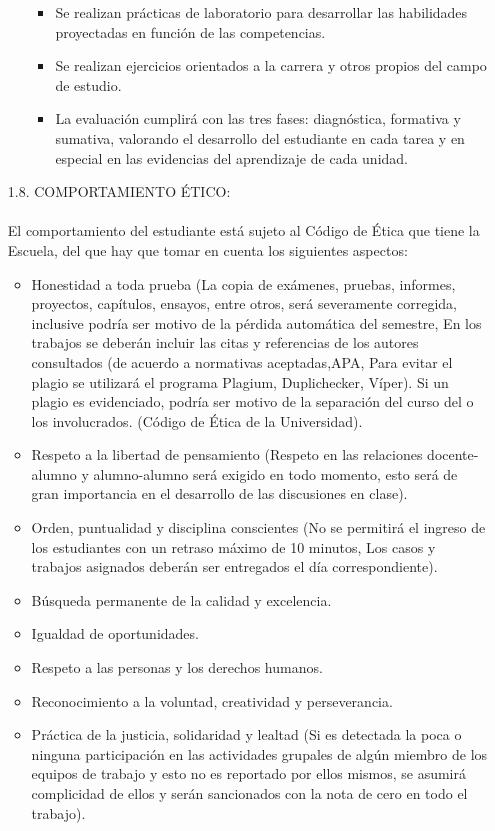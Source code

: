 \documentclass[10pt,a4paper]{article}
\begin{document}
\begin{enumerate}
\begin{enumerate}
\begin{itemize}
\item Se realizan prácticas de laboratorio para desarrollar las habilidades proyectadas en función de las competencias. 
\item Se realizan ejercicios orientados a la carrera y otros propios del campo de estudio.
\item	La evaluación cumplirá con las tres fases: diagnóstica, formativa y sumativa, valorando el desarrollo del estudiante en cada tarea y en especial en las evidencias del aprendizaje de cada unidad.
\end{itemize}
\end{enumerate}
\item[1.8.]		COMPORTAMIENTO ÉTICO:\\\\
El comportamiento del estudiante está sujeto al Código de Ética que tiene la Escuela, del que hay que tomar en cuenta los siguientes aspectos:
\begin{itemize}
\item	Honestidad a toda prueba (La copia de exámenes, pruebas, informes, proyectos, capítulos, ensayos, entre otros, será severamente corregida, inclusive podría ser motivo de la pérdida automática del semestre, En los trabajos se deberán incluir las citas y referencias de los autores consultados (de acuerdo a normativas aceptadas,APA, Para evitar el plagio se utilizará el programa  Plagium, Duplichecker, Víper). Si un plagio es evidenciado, podría ser motivo de la separación del curso del o los involucrados. (Código de Ética de la Universidad).
\item Respeto a la libertad de pensamiento (Respeto en las relaciones docente- alumno y alumno-alumno será exigido en todo momento, esto será de gran importancia en el desarrollo de las discusiones en clase).
\item	Orden, puntualidad y disciplina conscientes  (No se permitirá el ingreso de los estudiantes con un retraso máximo de 10 minutos, Los casos y trabajos asignados deberán ser entregados el día correspondiente).
\item Búsqueda permanente de la calidad y excelencia.
\item Igualdad de oportunidades.
\item	Respeto a las personas y los derechos humanos.
\item	Reconocimiento a la voluntad, creatividad y perseverancia.
\item	Práctica de la justicia, solidaridad y lealtad (Si es detectada la poca o ninguna participación en las actividades grupales de algún miembro de los equipos de trabajo y esto no es reportado por ellos mismos, se asumirá complicidad de ellos y serán sancionados con la nota de cero en todo el trabajo).

\end{itemize}
\end{enumerate}
\end{document}
